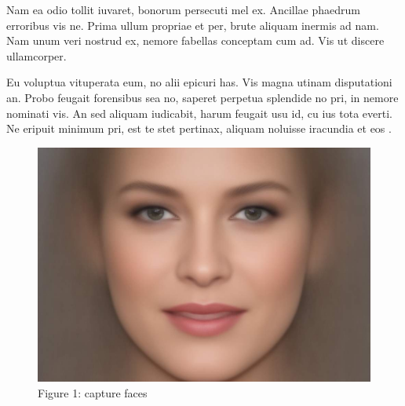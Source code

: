 \documentclass[onecolumn, draftclsnofoot,10pt, compsoc]{IEEEtran}
\begin{document}
Nam ea odio tollit iuvaret, bonorum persecuti mel ex. Ancillae phaedrum erroribus vis ne. Prima ullum propriae et per, brute aliquam inermis ad nam. Nam unum veri nostrud ex, nemore fabellas conceptam cum ad. Vis ut discere ullamcorper.

Eu voluptua vituperata eum, no alii epicuri has. Vis magna utinam disputationi an. Probo feugait forensibus sea no, saperet perpetua splendide no pri, in nemore nominati vis. An sed aliquam iudicabit, harum feugait usu id, cu ius tota everti. Ne eripuit minimum pri, est te stet pertinax, aliquam noluisse iracundia et eos \cite{defp}.

\begin{figure}[H]
\begin {center}
\includegraphics[width=\textwidth]{fig/fig.jpg}
\caption*{Figure 1: capture faces}
\end{center}
\centering
\end{figure}

\end{document}
